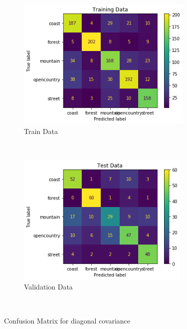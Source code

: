 \begin{figure}[!h]
    \centering
    \begin{subfigure}[t]{0.5\textwidth}
        \centering
        \includegraphics[height=2.5in]{Dataset_2b/diagonal covariance train confusion matrix.png}
        \caption{Train Data}
    \end{subfigure}%
    ~ 
    \begin{subfigure}[t]{0.5\textwidth}
        \centering
        \includegraphics[height=2.5in]{Dataset_2b/diagonal covariance test confusion matrix.png}
        \caption{Validation Data}
    \end{subfigure}%
    ~
    \caption{Confusion Matrix for diagonal covariance}
    \label{fig:30}
\end{figure}


